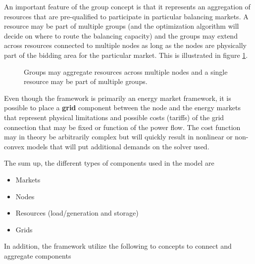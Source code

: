 \documentclass[]{report}
\renewcommand{\emph}{\textbf}
\begin{document}
An important feature of the group concept is that it represents an aggregation of resources that are pre-qualified to participate in particular balancing markets. A resource may be part of multiple groups (and the optimization algorithm will decide on where to route the balancing capacity) and the groups may extend across resources connected to multiple nodes as long as the nodes are physically part of the bidding area for the particular market. This is illustrated in  figure \ref{fig:multiplenodes}.

\begin{figure}
    
    \centering
    \caption{Groups may aggregate resources across multiple nodes and a single resource may be part of multiple groups.}
    \label{fig:multiplenodes}
\end{figure}

Even though the framework is primarily an energy market framework, it is possible to place a \emph{grid} component between the node and the energy markets that represent physical limitations and possible costs (tariffs) of the grid connection that may be fixed or function of the power flow. The cost function may in theory be arbitrarily complex but will quickly result in nonlinear or non-convex models that will put additional demands on the solver used.

The sum up, the different types of components used in the model are

\begin{itemize}
    \item Markets
    \item Nodes
    \item Resources (load/generation and storage)
    \item Grids
\end{itemize}

In addition, the framework utilize the following to concepts to connect and aggregate components
\end{document}

